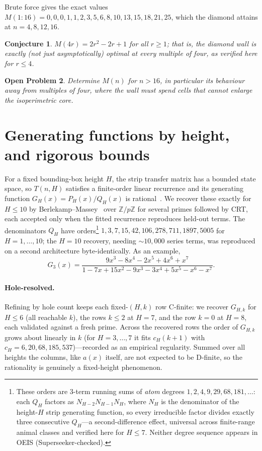 \documentclass[11pt]{article}
\newtheorem{conjecture}{Conjecture}
\newtheorem{openproblem}[conjecture]{Open Problem}
\begin{document}
Brute force gives the exact values
$M(1{:}16)=0,0,0,1,1,2,3,5,6,8,10,13,15,18,21,25$, which the diamond attains
at $n=4,8,12,16$.

\begin{conjecture}
\label{conj:diamond}
$M(4r)=2r^2-2r+1$ for all $r\ge1$; that is, the diamond wall is exactly (not
just asymptotically) optimal at every multiple of four, as verified here for
$r\le4$.
\end{conjecture}

\begin{openproblem}
\label{op:mn}
Determine $M(n)$ for $n>16$, in particular its behaviour away from multiples
of four, where the wall must spend cells that cannot enlarge the
isoperimetric core.
\end{openproblem}

\section{Generating functions by height, and rigorous bounds}
\label{sec:gf}

For a fixed bounding-box height $H$, the strip transfer matrix has a bounded
state space, so $T(n,H)$ satisfies a finite-order linear recurrence and its
generating function $G_H(x)=P_H(x)/Q_H(x)$ is rational~\cite{stanley}. We
recover these exactly for $H\le10$ by Berlekamp--Massey~\cite{massey} over
$\mathbb{Z}/p\mathbb{Z}$ for several primes followed by CRT, each accepted
only when the fitted recurrence reproduces held-out terms. The denominators
$Q_H$ have orders\footnote{These orders are $3$-term running sums of
\emph{atom} degrees $1,2,4,9,29,68,181,\dots$: each $Q_H$ factors as
$N_{H-2}N_{H-1}N_H$, where $N_H$ is the denominator of the height-$H$ strip
generating function, so every irreducible factor divides exactly three
consecutive $Q_H$---a second-difference effect, universal across finite-range
animal classes and verified here for $H\le7$. Neither degree sequence appears
in OEIS (Superseeker-checked).} $1,3,7,15,42,106,278,711,1897,5005$ for
$H=1,\dots,10$; the $H=10$ recovery, needing $\sim\!10{,}000$ series terms,
was reproduced on a second architecture byte-identically. As an example,
\[
  G_3(x)=\frac{9x^3-8x^4-2x^5+4x^6+x^7}{1-7x+15x^2-9x^3-3x^4+5x^5-x^6-x^7}.
\]

\paragraph{Hole-resolved.}
Refining by hole count keeps each fixed-$(H,k)$ row C-finite: we recover
$G_{H,k}$ for $H\le6$ (all reachable $k$), the rows $k\le2$ at $H=7$, and the
row $k=0$ at $H=8$, each validated against a fresh prime. Across the
recovered rows the order of $G_{H,k}$ grows about linearly in $k$ (for
$H=3,\dots,7$ it fits $c_H(k+1)$ with $c_H=6,20,68,185,537$)---recorded as an
empirical regularity. Summed over all heights the columns, like $a(x)$
itself, are not expected to be D-finite, so the rationality is genuinely a
fixed-height phenomenon.
\end{document}

